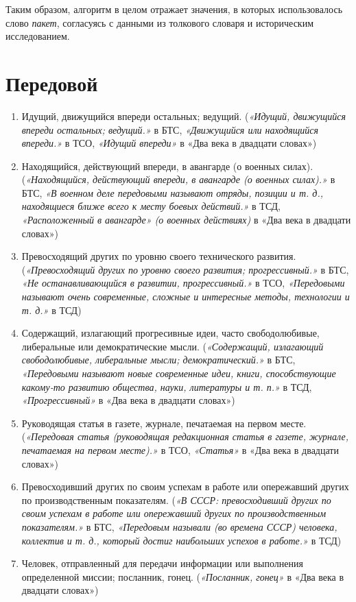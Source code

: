 Таким образом, алгоритм в целом отражает значения, в которых использовалось
слово \textit{пакет}, согласуясь с данными из толкового словаря и историческим исследованием.

\section*{Передовой}

\begin{enumerate}
    \item Идущий, движущийся впереди остальных; ведущий.
(\textit{«Идущий, движущийся впереди остальных; ведущий.»} в БТС,
\textit{«Движущийся или находящийся впереди.»} в ТСО,
\textit{«Идущий впереди»} в «Два века в двадцати словах»)

    \item Находящийся, действующий впереди, в авангарде (о военных силах).
(\textit{«Находящийся, действующий впереди, в авангарде (о военных силах).»} в БТС,
\textit{«В военном деле передовыми называют отряды, позиции и т. д., находящиеся ближе всего к месту боевых действий.»} в ТСД,
\textit{«Расположенный в авангарде» (о военных действиях)} в «Два века в двадцати словах»)

    \item Превосходящий других по уровню своего технического развития.
(\textit{«Превосходящий других по уровню своего развития; прогрессивный.»} в БТС,
\textit{«Не останавливающийся в развитии, прогрессивный.»} в ТСО,
\textit{«Передовыми называют очень современные, сложные и интересные методы, технологии и т. д.»} в ТСД)

    \item Содержащий, излагающий прогресивные идеи, часто свободолюбивые, либеральные или демократические мысли.
(\textit{«Содержащий, излагающий свободолюбивые, либеральные мысли; демократический.»} в БТС,
\textit{«Передовыми называют новые современные идеи, книги, способствующие какому-то развитию общества, науки, литературы и т. п.»} в ТСД,
\textit{«Прогрессивный»} в «Два века в двадцати словах»)

    \item Руководящая статья в газете, журнале, печатаемая на первом месте.
(\textit{«Передовая статья (руководящая редакционная статья в газете, журнале, печатаемая на первом месте).»} в ТСО,
\textit{«Статья»} в «Два века в двадцати словах»)

    \item Превосходивший других по своим успехам в работе или опережавший других по производственным показателям.
(\textit{«В СССР: превосходивший других по своим успехам в работе или опережавший других по производственным показателям.»} в БТС,
\textit{«Передовым называли (во времена СССР) человека, коллектив и т. д., который достиг наибольших успехов в работе.»} в ТСД)

    \item Человек, отправленный для передачи информации или выполнения определенной миссии; посланник, гонец.
(\textit{«Посланник, гонец»} в «Два века в двадцати словах»)
\end{enumerate}


